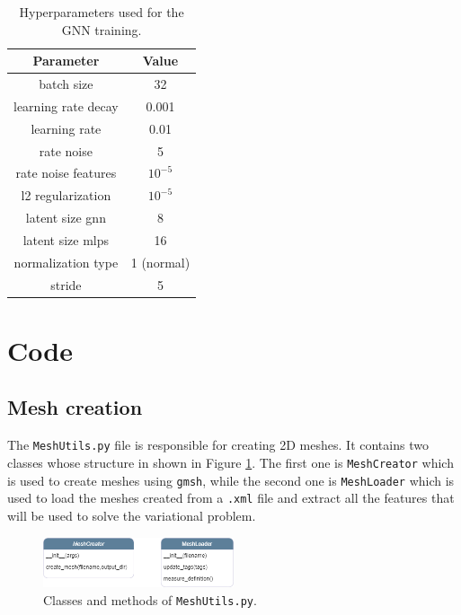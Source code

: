 \documentclass[11pt,a4paper]{article}
\begin{document}
\begin{table}[H]
    \centering
    \begin{tabular}{|c|c|}
        \hline
        \textbf{Parameter} & \textbf{Value} \\
        \hline
        batch size & 32 \\
        learning rate decay & 0.001 \\
        learning rate & 0.01 \\
        rate noise & 5 \\
        rate noise features & \(10^{-5}\) \\
        l2 regularization & \(10^{-5}\) \\
        latent size gnn & 8 \\
        latent size mlps & 16\\
        normalization type & 1 (normal) \\
        stride & 5 \\
        \hline   
    \end{tabular}
    \caption{Hyperparameters used for the GNN training.}
    \label{hyperparams}
\end{table}


\section{Code}


\subsection{Mesh creation}

The \texttt{MeshUtils.py} file is responsible for creating 2D meshes. It contains two classes whose structure in shown in Figure \ref{mesh_class}. The first one is \texttt{MeshCreator} which is used to create meshes using \texttt{gmsh}, while the second one is  \texttt{MeshLoader} which is used to load the meshes created from a \texttt{.xml} file and extract all the features that will be used to solve the variational problem.

\begin{figure}[H]
    \centering
    \includegraphics[width=0.5\textwidth]{Images/mesh_class.png}
    \caption{Classes and methods of \texttt{MeshUtils.py}.}
    \label{mesh_class}
\end{figure}
\end{document}
